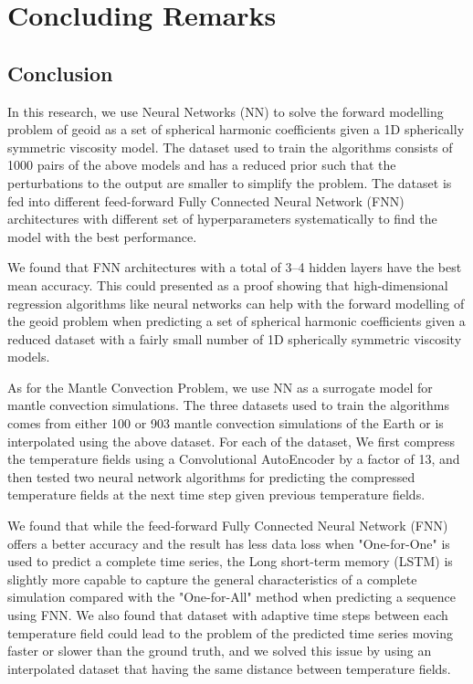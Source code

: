 \chapter{Concluding Remarks}\label{chap:conclusion}

\section{Conclusion}

In this research, we use Neural Networks (NN) to solve the forward modelling problem of geoid as a set of spherical harmonic coefficients given a 1D spherically symmetric viscosity model. The dataset used to train the algorithms consists of 1000 pairs of the above models and has a reduced prior such that the perturbations to the output are smaller to simplify the problem. The dataset is fed into different feed-forward Fully Connected Neural Network (FNN) architectures with different set of hyperparameters systematically to find the model with the best performance. 

We found that FNN architectures with a total of 3–4 hidden layers have the best mean accuracy. This could presented as a proof showing that high-dimensional regression algorithms like neural networks can help with the forward modelling of the geoid problem when predicting a set of spherical harmonic coefficients given a reduced dataset with a fairly small number of 1D spherically symmetric viscosity models.

As for the Mantle Convection Problem, we use NN as a surrogate model for mantle convection simulations. The three datasets used to train the algorithms comes from either 100 or 903 mantle convection simulations of the Earth or is interpolated using the above dataset. For each of the dataset, We first compress the temperature fields using a Convolutional AutoEncoder by a factor of 13, and then tested two neural network algorithms for predicting the compressed temperature fields at the next time step given previous temperature fields. 

We found that while the feed-forward Fully Connected Neural Network (FNN) offers a better accuracy and the result has less data loss when "One-for-One" is used to predict a complete time series, the Long short-term memory (LSTM) is slightly more capable to capture the general characteristics of a complete simulation compared with the "One-for-All" method when predicting a sequence using FNN. We also found that dataset with adaptive time steps between each temperature field could lead to the problem of the predicted time series moving faster or slower than the ground truth, and we solved this issue by using an interpolated dataset that having the same distance between temperature fields.

